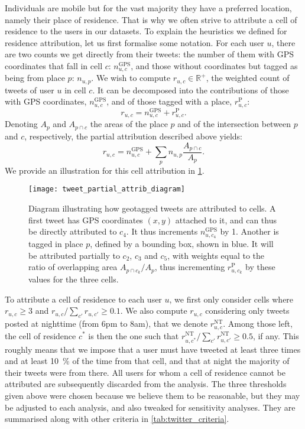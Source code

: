 \documentclass[../thesis.tex]{subfiles}
\begin{document}
Individuals are mobile but for the vast majority they have a preferred location, namely
their place of residence. That is why we often strive to attribute a cell of residence
to the users in our datasets. To explain the heuristics we defined for residence
attribution, let us first formalise some notation. For each user $u$, there are two
counts we get directly from their tweets: the number of them with GPS coordinates that
fall in cell $c$: $n_{u, c}^{\text{GPS}}$, and those without coordinates but tagged as
being from place $p$: $n_{u, p}$.  We wish to compute $r_{u, c} \in \mathbb{R}^+$, the
weighted count of tweets of user $u$ in cell $c$. It can be decomposed into the contributions of
those with GPS coordinates, $n_{u, c}^{\text{GPS}}$, and of those tagged with a place, $r_{u,
c}^{\text{P}}$:
\begin{equation}
  r_{u, c}
    = n_{u, c}^{\text{GPS}} + r_{u, c}^{\text{P}}.
\end{equation}
Denoting $A_p$ and $A_{p \cap c}$ the areas of the place $p$ and of the intersection
between $p$ and $c$, respectively, the partial attribution described above yields:
\begin{equation}
  r_{u, c} = n_{u, c}^{\text{GPS}} + \sum_p n_{u, p} \frac{A_{p \cap c}}{A_p}.
\end{equation}
We provide an illustration for this cell attribution in
\cref{fig:tweet_partial_attrib_diagram}.
\begin{figure}[hb]
\centering
  \texttt{[image: tweet\_partial\_attrib\_diagram]}
  \caption{Diagram illustrating how geotagged tweets are attributed to cells. A first
  tweet has GPS coordinates $(x, y)$ attached to it, and can thus be directly attributed
  to $c_4$. It thus increments $n_{u, c_4}^{\text{GPS}}$ by 1. Another is tagged in
  place $p$, defined by a bounding box, shown in blue. It will be attributed partially
  to $c_2$, $c_3$ and $c_5$, with weights equal to the ratio of overlapping area
  $A_{p \cap c_k} / A_p$, thus incrementing $r_{u, c_k}^{\text{P}}$ by these
  values for the three cells.}
  \label{fig:tweet_partial_attrib_diagram}
\end{figure}

To attribute a cell of residence to each user $u$, we first only consider cells where
$r_{u, c} \geq 3$ and $r_{u, c} / \sum_{c'} r_{u, c'} \geq 0.1$. We also compute
$r_{u,c}$ considering only tweets posted at nighttime (from 6pm to 8am), that we denote
$r_{u, c}^\text{NT}$. Among those left, the cell of residence $c^*$ is then the one such
that $r_{u, c^*}^\text{NT} / \sum_{c'} r_{u, c'}^\text{NT} \geq 0.5$, if any. This
roughly means that we impose that a user must have tweeted at least three times and at
least \SI{10}{\percent} of the time from that cell, and that at night the majority of
their tweets were from there. All users for whom a cell of residence cannot be
attributed are subsequently discarded from the analysis. The three thresholds given
above were chosen because we believe them to be reasonable, but they may be adjusted to
each analysis, and also tweaked for sensitivity analyses. They are summarised along with
other criteria in \cref{tab:twitter_criteria}.
\end{document}
